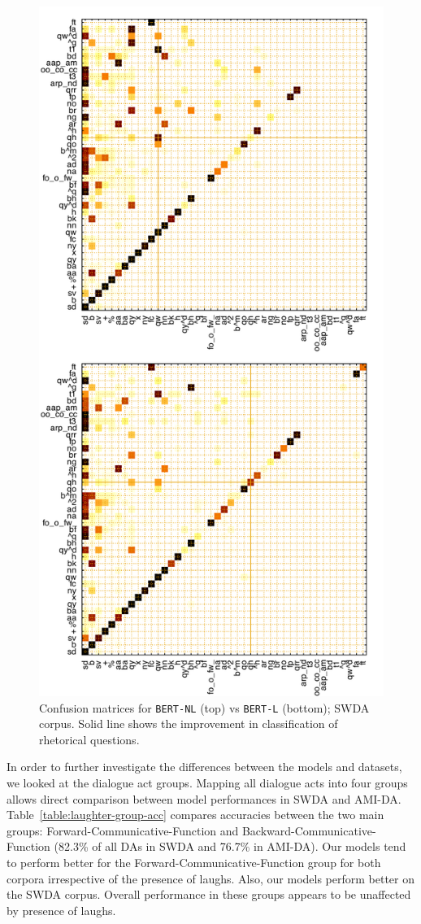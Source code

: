 \documentclass[11pt,a4paper]{article}
\begin{document}
  \begin{figure}
  \centering
  \includegraphics[width=0.9\linewidth]{img/swda-cm.pdf}
  \caption{Confusion matrices for \texttt{BERT-NL} (top) vs \texttt{BERT-L} (bottom); SWDA corpus. Solid line shows the improvement in classification of rhetorical questions.}
    \label{fig:swda-cm}
  \end{figure}

In order to further investigate the differences between the models and datasets, we looked at the dialogue act groups.
Mapping all dialogue acts into four groups allows direct comparison between model performances in SWDA and AMI-DA.
Table~\ref{table:laughter-group-acc} compares accuracies between the two main groups: Forward-Communicative-Function and Backward-Communicative-Function (82.3\% of all DAs in SWDA and 76.7\% in AMI-DA).
Our models tend to perform better for the Forward-Communicative-Function group for both corpora irrespective of the presence of laughs.
Also, our models perform better on the SWDA corpus.
Overall performance in these groups appears to be unaffected by presence of laughs.
\end{document}
